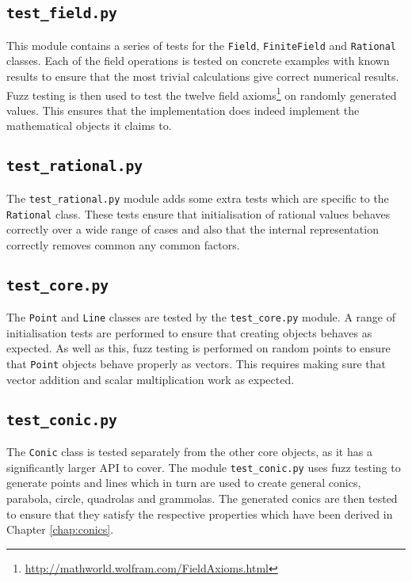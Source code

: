\subsection{\texttt{test\_field.py}}

This module contains a series of tests for the \texttt{Field}, \texttt{FiniteField} and \texttt{Rational} classes.
Each of the field operations is tested on concrete examples with known results to ensure that the most trivial calculations give correct numerical results.
Fuzz testing is then used to test the twelve field axioms\footnote{\url{http://mathworld.wolfram.com/FieldAxioms.html}} on randomly generated values.
This ensures that the implementation does indeed implement the mathematical objects it claims to.

\subsection{\texttt{test\_rational.py}}

The \texttt{test\_rational.py} module adds some extra tests which are specific to the \texttt{Rational} class.
These tests ensure that initialisation of rational values behaves correctly over a wide range of cases and also that the internal representation correctly removes common any common factors.

\subsection{\texttt{test\_core.py}}

The \texttt{Point} and \texttt{Line} classes are tested by the \texttt{test\_core.py} module.
A range of initialisation tests are performed to ensure that creating objects behaves as expected.
As well as this, fuzz testing is performed on random points to ensure that \texttt{Point} objects behave properly as vectors.
This requires making sure that vector addition and scalar multiplication work as expected.

\subsection{\texttt{test\_conic.py}}
The \texttt{Conic} class is tested separately from the other core objects, as it has a significantly larger API to cover.
The module \texttt{test\_conic.py} uses fuzz testing to generate points and lines which in turn are used to create general conics, parabola, circle, quadrolas and grammolas.
The generated conics are then tested to ensure that they satisfy the respective properties which have been derived in Chapter \ref{chap:conics}.

